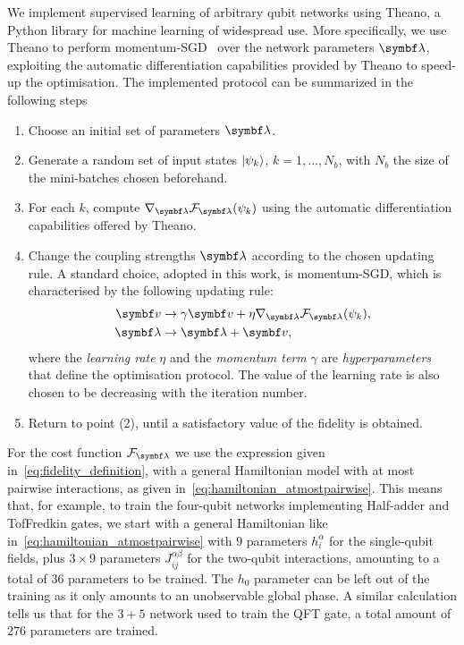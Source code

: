 We implement supervised learning of arbitrary qubit networks using Theano\cite{team2016theano}, a Python library for machine learning of widespread use.
More specifically, we use Theano to perform momentum-\ac{SGD}~\cite{ruder2016an} over the network parameters $\bslambda$, exploiting the automatic differentiation capabilities provided by Theano to speed-up the optimisation.
The implemented protocol can be summarized in the following steps
\begin{enumerate}
	\item Choose an initial set of parameters $\bs\lambda$.
	\item Generate a random set of input states $\ket{\psi_k}$, $k=1,..., N_b$, with $N_b$ the size of the mini-batches chosen beforehand.
	\item For each $k$, compute $\grad_{\bs\lambda} \calF_{\bs\lambda}(\psi_k)$ using the automatic differentiation capabilities offered by Theano.
	\item Change the coupling strengths $\bs\lambda$ according to the chosen updating rule. A standard choice, adopted in this work, is momentum-SGD, which is characterised by the following updating rule:
	\begin{equation}
	\begin{aligned}
		\bs v &\to \gamma \bs v + \eta \grad_{\bs\lambda} \calF_{\bs\lambda}(\psi_k), \\
		\bs\lambda &\to \bs\lambda + \bs v,
	\end{aligned}
	\end{equation}
	where the \emph{learning rate} $\eta$ and the \emph{momentum term} $\gamma$ are \emph{hyperparameters} that define the optimisation protocol.
	The value of the learning rate is also chosen to be decreasing with the iteration number.
	\item Return to point (2), until a satisfactory value of the fidelity is obtained.
\end{enumerate}
For the cost function $\calF_\bslambda$ we use the expression given in~\cref{eq:fidelity_definition}, with a general Hamiltonian model with at most pairwise interactions, as given in~\cref{eq:hamiltonian_atmostpairwise}.
This means that, for example, to train the four-qubit networks implementing Half-adder and TofFredkin gates, we start with a general Hamiltonian like in~\cref{eq:hamiltonian_atmostpairwise} with $9$ parameters $h_i^\alpha$ for the single-qubit fields, plus $3\times9$ parameters $J_{ij}^{\alpha\beta}$ for the two-qubit interactions, amounting to a total of $36$ parameters to be trained.
The $h_0$ parameter can be left out of the training as it only amounts to an unobservable global phase.
A similar calculation tells us that for the $3+5$ network used to train the \ac{QFT} gate, a total amount of $276$ parameters are trained.

